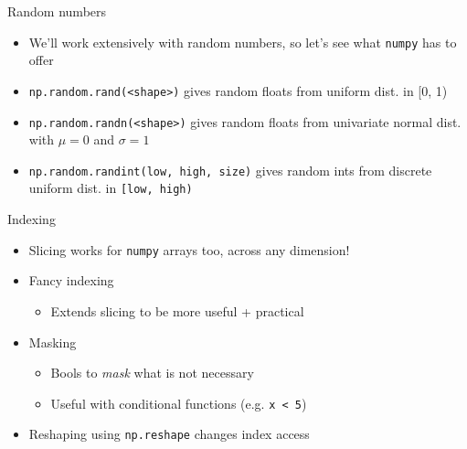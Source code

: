 \documentclass[presentation]{beamer}
\begin{document}
\begin{frame}[label={sec:orgc25f801},fragile]{Random numbers}
\begin{itemize}
\item We'll work extensively with random numbers, so let's see what \texttt{numpy} has
to offer
\item \texttt{np.random.rand(<shape>)} gives random floats from uniform dist. in [0, 1)
\item \texttt{np.random.randn(<shape>)} gives random floats from univariate normal
dist. with \(\mu = 0\) and \(\sigma = 1\)
\item \texttt{np.random.randint(low, high, size)} gives random ints from discrete uniform dist.
in \texttt{[low, high)}
\end{itemize}
\end{frame}
\begin{frame}[label={sec:org5da2caf},fragile]{Indexing}
\begin{itemize}
\item Slicing works for \texttt{numpy} arrays too, across any dimension!
\item Fancy indexing
\begin{itemize}
\item Extends slicing to be more useful + practical
\end{itemize}
\item Masking
\begin{itemize}
\item Bools to \emph{mask} what is not necessary
\item Useful with conditional functions (e.g. \texttt{x < 5})
\end{itemize}
\item Reshaping using \texttt{np.reshape} changes index access
\end{itemize}
\end{frame}
\end{document}
